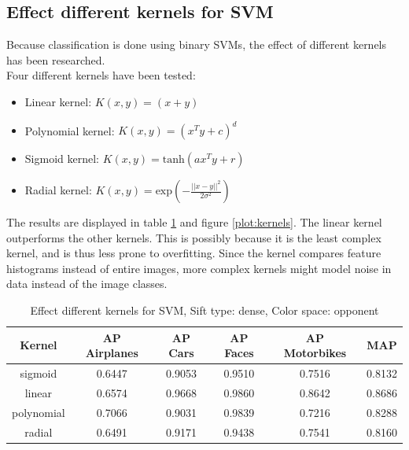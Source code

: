 \subsection{Effect different kernels for SVM}
Because classification is done using binary SVMs, the effect of different kernels has been researched.\\
Four different kernels have been tested:
\begin{itemize}
\item Linear kernel: $K(x,y) = (x+y)$\\
\item Polynomial kernel: $K(x,y) = (x^Ty + c)^d$\\
\item Sigmoid kernel: $K(x,y) = \text{tanh}(ax^Ty + r)$\\
\item Radial kernel: $K(x,y) = \text{exp}(-\frac{||x-y||^2}{2\sigma^2})$\\
\end{itemize}
The results are displayed in table \ref{tab:kernels} and figure \ref{plot:kernels}. The linear kernel outperforms the other kernels. This is possibly because it is the least complex kernel, and is thus less prone to overfitting. Since the kernel compares feature histograms instead of entire images, more complex kernels might model noise in data instead of the image classes.

\begin{table}[H]
\begin{tabular}{|c|ccccc|}
\hline
\textbf{Kernel} & \textbf{AP Airplanes} & \textbf{AP Cars} & \textbf{AP Faces} & \textbf{AP Motorbikes} & \textbf{MAP}\\
\hline
sigmoid & 0.6447 & 0.9053 & 0.9510 & 0.7516 & 0.8132\\
linear & 0.6574 & 0.9668 & 0.9860 & 0.8642 & 0.8686 \\
polynomial & 0.7066 & 0.9031 & 0.9839& 0.7216& 0.8288\\
radial & 0.6491 & 0.9171 & 0.9438 & 0.7541 & 0.8160\\
\hline
\end{tabular}
\caption{Effect different kernels for SVM, Sift type: dense, Color space: opponent}
\label{tab:kernels}
\end{table}

